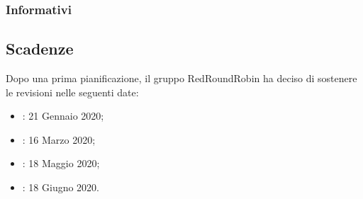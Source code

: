 		\subsubsection{Informativi}
			

	\subsection{Scadenze}
		Dopo una prima pianificazione, il gruppo RedRoundRobin ha deciso di sostenere le revisioni nelle seguenti date:
		\begin{itemize}
			\item {}: 21 Gennaio 2020;
			\item {}: 16 Marzo 2020;
			\item {}: 18 Maggio 2020;
			\item {}: 18 Giugno 2020.
		\end{itemize}

